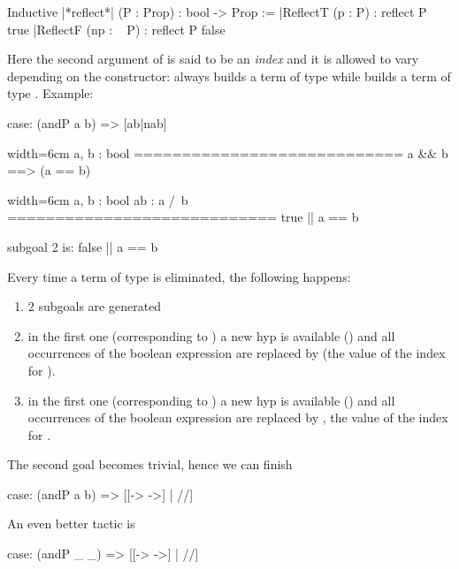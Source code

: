 \begin{coq}{}{}
Inductive |*reflect*| (P : Prop) : bool -> Prop :=
|ReflectT (p : P)    : reflect P true
|ReflectF (np : ~ P) : reflect P false
\end{coq}

Here the second argument of  is said to be an \emph{index}
and it is allowed to vary depending on the constructor:  always
builds a term of type  while  builds
a term of type .
Example:

\begin{coq}{}{}
case: (andP a b) => [ab|nab]
\end{coq}

\begin{coqout}{}{width=6cm}
a, b : bool
============================
a && b ==> (a == b)
\end{coqout}
\begin{coqout}{}{width=6cm}
a, b : bool
ab : a /\ b
============================
true || a == b 

subgoal 2 is:
false || a == b 
\end{coqout}

Every time a term of type  is eliminated, the
following happens:
\begin{enumerate}
\item 2 subgoals are generated
\item in the first one (corresponding to ) a new hyp is
  available () and all occurrences of the boolean
  expression  are replaced by  (the value of the index
  for ).
\item in the first one (corresponding to ) a new hyp is
  available () and all occurrences of the boolean
  expression  are replaced by , the value of
  the index for .
\end{enumerate}

The second goal becomes trivial, hence we can finish

\begin{coq}{}{}
case: (andP a b) => [[-> ->] | //]
\end{coq}

An even better tactic is

\begin{coq}{}{}
case: (andP _ _) => [[-> ->] | //]
\end{coq}

